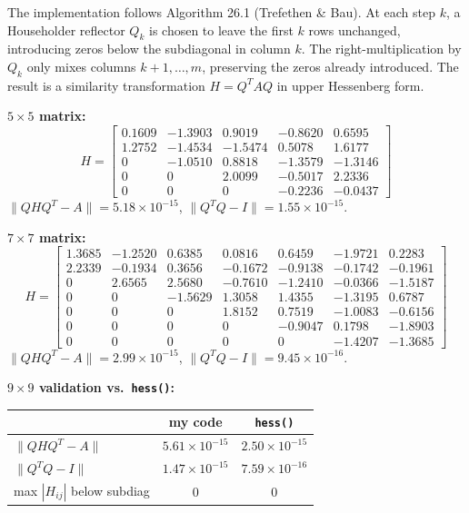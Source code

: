 \documentclass[11pt]{article}
\begin{document}
The implementation follows Algorithm 26.1 (Trefethen \& Bau). At each step $k$, a Householder reflector $Q_k$ is chosen to leave the first $k$ rows unchanged, introducing zeros below the subdiagonal in column $k$. The right-multiplication by $Q_k$ only mixes columns $k{+}1,\ldots,m$, preserving the zeros already introduced. The result is a similarity transformation $H = Q^TAQ$ in upper Hessenberg form.

\textbf{$5\times5$ matrix:}
$$H = \begin{bmatrix}
 0.1609 & -1.3903 &  0.9019 & -0.8620 &  0.6595 \\
 1.2752 & -1.4534 & -1.5474 &  0.5078 &  1.6177 \\
 0      & -1.0510 &  0.8818 & -1.3579 & -1.3146 \\
 0      &  0      &  2.0099 & -0.5017 &  2.2336 \\
 0      &  0      &  0      & -0.2236 & -0.0437
\end{bmatrix}$$
$\|QHQ^T - A\| = 5.18\times10^{-15}$, \quad $\|Q^TQ - I\| = 1.55\times10^{-15}$.

\textbf{$7\times7$ matrix:}
$$H = \begin{bmatrix}
 1.3685 & -1.2520 &  0.6385 &  0.0816 &  0.6459 & -1.9721 &  0.2283 \\
 2.2339 & -0.1934 &  0.3656 & -0.1672 & -0.9138 & -0.1742 & -0.1961 \\
 0      &  2.6565 &  2.5680 & -0.7610 & -1.2410 & -0.0366 & -1.5187 \\
 0      &  0      & -1.5629 &  1.3058 &  1.4355 & -1.3195 &  0.6787 \\
 0      &  0      &  0      &  1.8152 &  0.7519 & -1.0083 & -0.6156 \\
 0      &  0      &  0      &  0      & -0.9047 &  0.1798 & -1.8903 \\
 0      &  0      &  0      &  0      &  0      & -1.4207 & -1.3685
\end{bmatrix}$$
$\|QHQ^T - A\| = 2.99\times10^{-15}$, \quad $\|Q^TQ - I\| = 9.45\times10^{-16}$.

\textbf{$9\times9$ validation vs.\ \texttt{hess()}:}

\begin{center}
\begin{tabular}{lcc}
\hline
 & my code & \verb|hess()| \\
\hline
$\|QHQ^T - A\|$ & $5.61\times10^{-15}$ & $2.50\times10^{-15}$ \\
$\|Q^TQ - I\|$  & $1.47\times10^{-15}$ & $7.59\times10^{-16}$ \\
max $|H_{ij}|$ below subdiag & $0$ & $0$ \\
\hline
\end{tabular}
\end{center}
\end{document}
